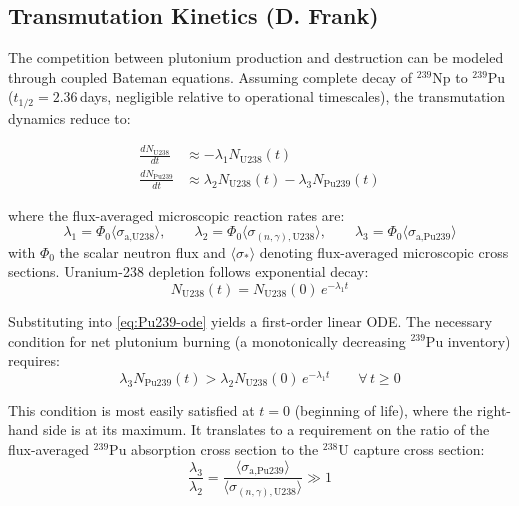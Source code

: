 

\subsection{Transmutation Kinetics (D. Frank)}
\label{sec:transmutation-kinetics}

The competition between plutonium production and destruction can be modeled through coupled Bateman equations. Assuming complete decay of $^{239}$Np to $^{239}$Pu ($t_{1/2} = 2.36$\,days, negligible relative to operational timescales), the transmutation dynamics reduce to:

\begin{align}
    \frac{dN_\text{U238}}{dt}  &\approx -\lambda_1 N_\text{U238}(t) \label{eq:U238-ode} \\
    \frac{dN_\text{Pu239}}{dt} &\approx \lambda_2 N_\text{U238}(t) - \lambda_3 N_\text{Pu239}(t) \label{eq:Pu239-ode}
\end{align}

\noindent where the flux-averaged microscopic reaction rates are:
\begin{equation}
    \lambda_1 = \Phi_0 \langle \sigma_\text{a,U238} \rangle, \qquad
    \lambda_2 = \Phi_0 \langle \sigma_{(n,\gamma),\text{U238}} \rangle, \qquad
    \lambda_3 = \Phi_0 \langle \sigma_\text{a,Pu239} \rangle
\end{equation}
with $\Phi_0$ the scalar neutron flux and $\langle \sigma_* \rangle$ denoting flux-averaged microscopic cross sections. Uranium-238 depletion follows exponential decay:
\begin{equation}
    N_\text{U238}(t) = N_\text{U238}(0)\,e^{-\lambda_1 t}
\end{equation}

Substituting into \eqref{eq:Pu239-ode} yields a first-order linear ODE. The necessary condition for net plutonium burning (a monotonically decreasing $^{239}$Pu inventory) requires:
\begin{equation}
    \lambda_3 N_\text{Pu239}(t) > \lambda_2 N_\text{U238}(0)\,e^{-\lambda_1 t} \qquad \forall\, t \geq 0
    \label{eq:burn-condition}
\end{equation}

This condition is most easily satisfied at $t = 0$ (beginning of life), where the right-hand side is at its maximum. It translates to a requirement on the ratio of the flux-averaged $^{239}$Pu absorption cross section to the $^{238}$U capture cross section:
\begin{equation}
    \frac{\lambda_3}{\lambda_2} = \frac{\langle \sigma_\text{a,Pu239} \rangle}{\langle \sigma_{(n,\gamma),\text{U238}} \rangle} \gg 1
    \label{eq:ratio-condition}
\end{equation}

